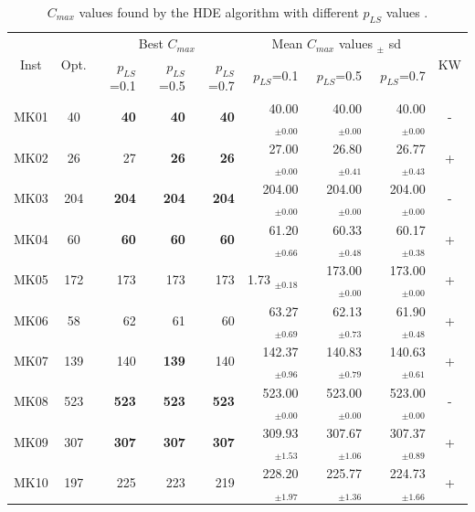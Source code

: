 \begin{table}[!tb]
\scriptsize
\centering

\caption{$C_{max}$ values found by the HDE algorithm with different $p_{LS}$ values%
.}
\begin{tabular}{|c|c|rrr|rrr|c|}
\hline
\multicolumn{1}{|c}{\multirow{2}{*}{Inst}} & \multicolumn{1}{|c}{\multirow{2}{*}{Opt.}} & \multicolumn{3}{|c}{Best $C_{max}$} & \multicolumn{3}{|c|}{Mean $C_{max}$ values $_{\pm}$ sd} &\multicolumn{1}{c|}{\multirow{2}{*}{KW}} \\
\cline{3-8}
\multicolumn{1}{|c}{} & \multicolumn{1}{|c|}{} &$p_{LS}$=0.1 & $p_{LS}$=0.5 & $p_{LS}$=0.7 & $p_{LS}$=0.1 & $p_{LS}$=0.5 & $p_{LS}$=0.7 & \multicolumn{1}{c|}{}\\
\hline
MK01 & 40 & \textbf{40} & \textbf{40} & \textbf{40} & 40.00  $_{\pm  0.00  }$ & 40.00  $_{\pm  0.00  }$ & 40.00  $_{\pm  0.00  }$ & -\\
MK02 & 26 & 27 & \textbf{26} & \textbf{26} & 27.00  $_{\pm  0.00  }$ & 26.80  $_{\pm  0.41  }$ & 26.77  $_{\pm  0.43  }$ & + \\
MK03 & 204 & \textbf{204} & \textbf{204} & \textbf{204} & 204.00  $_{\pm  0.00  }$ & 204.00  $_{\pm  0.00  }$ & 204.00  $_{\pm  0.00  }$ & - \\
MK04 & 60 & \textbf{60} & \textbf{60} & \textbf{60} & 61.20  $_{\pm  0.66  }$ & 60.33  $_{\pm  0.48  }$ & 60.17  $_{\pm  0.38  }$ & +\\
MK05 & 172 & 173 & 173 & 173 & 1.73  $_{\pm  0.18  }$ & 173.00  $_{\pm  0.00  }$ & 173.00  $_{\pm  0.00  }$ & +\\
MK06 & 58 & 62 & 61 & 60 & 63.27  $_{\pm  0.69  }$ & 62.13  $_{\pm  0.73  }$ & 61.90  $_{\pm  0.48  }$ & +\\
MK07 & 139 & 140 & \textbf{139} & 140 & 142.37  $_{\pm  0.96  }$ & 140.83  $_{\pm 0.79  }$ & 140.63  $_{\pm  0.61  }$ &+\\
MK08 & 523 & \textbf{523} & \textbf{523} & \textbf{523} & 523.00  $_{\pm 0.00  }$ & 523.00  $_{\pm  0.00  }$ & 523.00  $_{\pm  0.00  }$ &-\\
MK09 & 307 & \textbf{307} & \textbf{307} & \textbf{307} & 309.93  $_{\pm  1.53  }$ & 307.67  $_{\pm  1.06  }$ & 307.37  $_{\pm  0.89  }$ &+\\
MK10 & 197 & 225 & 223 & 219 & 228.20  $_{\pm  1.97  }$ & 225.77  $_{\pm  1.36  }$ & 224.73  $_{\pm  1.66 }$ &+\\
\hline
\end{tabular}
\label{tab:HDE}
\end{table}

